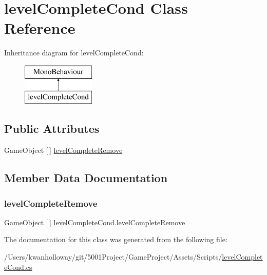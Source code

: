 \hypertarget{classlevel_complete_cond}{}\section{level\+Complete\+Cond Class Reference}
\label{classlevel_complete_cond}
Inheritance diagram for level\+Complete\+Cond\+:\begin{figure}[H]
\begin{center}
\leavevmode
\includegraphics[height=2.000000cm]{classlevel_complete_cond}
\end{center}
\end{figure}
\subsection*{Public Attributes}
\begin{DoxyCompactItemize}
\item 
Game\+Object \mbox{[}$\,$\mbox{]} \hyperlink{classlevel_complete_cond_adf0e456569f3f5ccd52212147e98f743}{level\+Complete\+Remove}
\end{DoxyCompactItemize}


\subsection{Member Data Documentation}
\mbox{\label{classlevel_complete_cond_adf0e456569f3f5ccd52212147e98f743}} 
\subsubsection{\texorpdfstring{level\+Complete\+Remove}{levelCompleteRemove}}
{\footnotesize\ttfamily Game\+Object \mbox{[}$\,$\mbox{]} level\+Complete\+Cond.\+level\+Complete\+Remove}



The documentation for this class was generated from the following file\+:\begin{DoxyCompactItemize}
\item 
/\+Users/kwanholloway/git/5001\+Project/\+Game\+Project/\+Assets/\+Scripts/\hyperlink{level_complete_cond_8cs}{level\+Complete\+Cond.\+cs}\end{DoxyCompactItemize}
